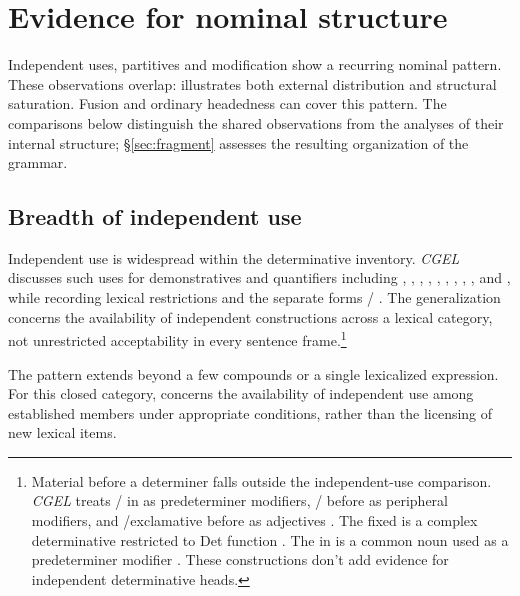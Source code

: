 \documentclass[12pt]{article}
\begin{document}
\section{Evidence for nominal structure}\label{sec:evidence}

Independent uses, partitives and modification show a recurring nominal pattern. These observations overlap:  illustrates both external distribution and structural saturation. Fusion and ordinary headedness can cover this pattern. The comparisons below distinguish the shared observations from the analyses of their internal structure; §\ref{sec:fragment} assesses the resulting organization of the grammar.

\subsection{Breadth of independent use}\label{sec:independent}

Independent use is widespread within the determinative inventory. \textit{CGEL} discusses such uses for demonstratives and quantifiers including , , , , , , , , ,  and , while recording lexical restrictions and the separate forms / \citep[371--372, 410--424]{huddleston2002}. The generalization concerns the availability of independent constructions across a lexical category, not unrestricted acceptability in every sentence frame.\footnote{Material before a determiner falls outside the independent-use comparison. \textit{CGEL} treats / in  as predeterminer modifiers, / before  as peripheral modifiers, and /exclamative  before  as adjectives \citep[433--437]{huddleston2002}. The fixed  is a complex determinative restricted to Det function \citep[394]{huddleston2002}. The  in  is a common noun used as a predeterminer modifier \citep[434]{huddleston2002}. These constructions don't add evidence for independent determinative heads.}

The pattern extends beyond a few compounds or a single lexicalized expression. For this closed category,  concerns the availability of independent use among established members under appropriate conditions, rather than the licensing of new lexical items.
\end{document}
